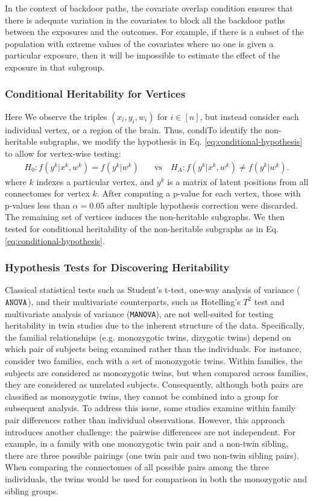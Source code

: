 In the context of backdoor paths, the covariate overlap condition ensures that there is adequate variation in the covariates to block all the backdoor paths between the exposures and the outcomes. For example, if there is a subset of the population with extreme values of the covariates where no one is given a particular exposure, then it will be impossible to estimate the effect of the exposure in that subgroup. 

\subsubsection{Conditional Heritability for Vertices} \label{sec:cond-effect-vert}
Here 
We observe the triples $(x_i, y_i, w_i)$ for $i\in[n]$, but instead consider each individual vertex, or a region of the brain. Thus, condiTo identify the non-heritable subgraphs, we modify the hypothesis in Eq. \ref{eq:conditional-hypothesis} to allow for vertex-wise testing:
\begin{align}
    H_0: f(y^k|x^k, w^k) = f(y^k|w^k) \quad &\text{vs} \quad 
    H_A: f(y^k|x^k, w^k) \neq f(y^k|w^k).
    \label{eq:vertex-wise-conditional-hypothesis}
\end{align}
where $k$ indexes a particular vertex, and $y^k$ is a matrix of latent positions from all connectomes for vertex $k$. After computing a p-value for each vertex, those with p-values less than $\alpha=0.05$ after multiple hypothesis correction were discarded. The remaining set of vertices induces the non-heritable subgraphs. We then tested for conditional heritability of the non-heritable subgraphs as in Eq. \ref{eq:conditional-hypothesis}. 

\subsubsection{Hypothesis Tests for Discovering Heritability} \label{sec:method-dcorr}
Classical statistical tests such as Student's t-test, one-way analysis of variance ($\operatorname{\mathtt{ANOVA}}$), and their multivariate counterparts, such as Hotelling's $T^2$ test and multivariate analysis of variance (\texttt{MANOVA}), are not well-suited for testing heritability in twin studies due to the inherent structure of the data. Specifically, the familial relationships (e.g. monozygotic twins, dizygotic twins) depend on which pair of subjects being examined rather than the individuals. For instance, consider two families, each with a set of monozygotic twins. Within families, the subjects are considered as monozygotic twins, but when compared across families, they are considered as unrelated subjects. Consequently, although both pairs are classified as monozygotic twins, they cannot be combined into a group for subsequent analysis. To address this issue, some studies examine within family pair differences rather than individual observations. However, this approach introduces another challenge: the pairwise differences are not independent. For example, in a family with one monozygotic twin pair and a non-twin sibling, there are three possible pairings (one twin pair and two non-twin sibling pairs). When comparing the connectomes of all possible pairs among the three individuals, the twins would be used for comparison in both the monozygotic and sibling groups.

